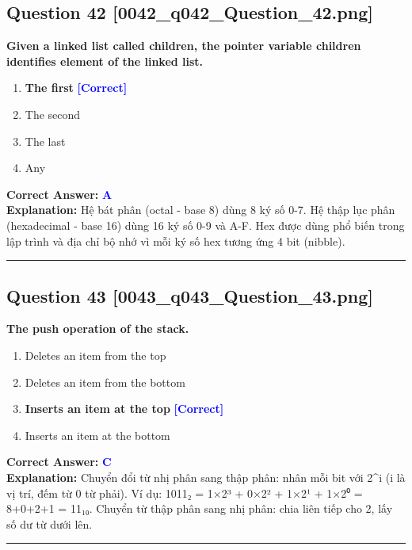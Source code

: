 \documentclass[11pt,a4paper]{article}
\begin{document}
\begin{minipage}{\textwidth}
\subsection*{Question 42 \quad \footnotesize{[0042\_q042\_Question\_42.png]}}
\noindent \textbf{Given a linked list called children, the pointer variable children identifies element of the linked list.}

\begin{enumerate}[label=\Alph*.]
    \item \textbf{The first} \hfill \textcolor{blue}{\textbf{[Correct]}}
    \item The second
    \item The last
    \item Any
\end{enumerate}

\noindent \textbf{Correct Answer:} \textcolor{blue}{\textbf{A}} \\[2pt]
\noindent \textbf{Explanation:} Hệ bát phân (octal - base 8) dùng 8 ký số 0-7. Hệ thập lục phân (hexadecimal - base 16) dùng 16 ký số 0-9 và A-F. Hex được dùng phổ biến trong lập trình và địa chỉ bộ nhớ vì mỗi ký số hex tương ứng 4 bit (nibble).

\par\vspace{0.3cm}
\hrule
\vspace{0.3cm}
\end{minipage}

\begin{minipage}{\textwidth}
\subsection*{Question 43 \quad \footnotesize{[0043\_q043\_Question\_43.png]}}
\noindent \textbf{The push operation of the stack.}

\begin{enumerate}[label=\Alph*.]
    \item Deletes an item from the top
    \item Deletes an item from the bottom
    \item \textbf{Inserts an item at the top} \hfill \textcolor{blue}{\textbf{[Correct]}}
    \item Inserts an item at the bottom
\end{enumerate}

\noindent \textbf{Correct Answer:} \textcolor{blue}{\textbf{C}} \\[2pt]
\noindent \textbf{Explanation:} Chuyển đổi từ nhị phân sang thập phân: nhân mỗi bit với 2\textasciicircum{}i (i là vị trí, đếm từ 0 từ phải). Ví dụ: 1011₂ = 1×2³ + 0×2² + 1×2¹ + 1×2⁰ = 8+0+2+1 = 11₁₀. Chuyển từ thập phân sang nhị phân: chia liên tiếp cho 2, lấy số dư từ dưới lên.

\par\vspace{0.3cm}
\hrule
\vspace{0.3cm}
\end{minipage}
\end{document}
